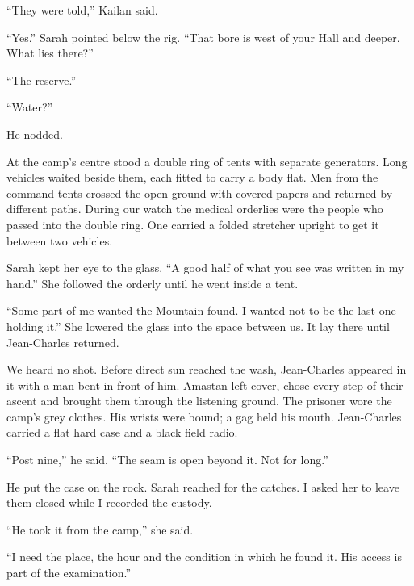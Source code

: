 ``They were told,'' Kailan said.\par

``Yes.'' Sarah pointed below the rig. ``That bore is west of your Hall and deeper. What lies there?''\par

``The reserve.''\par

``Water?''\par

He nodded.\par

At the camp's centre stood a double ring of tents with separate generators. Long vehicles waited beside them, each fitted to carry a body flat. Men from the command tents crossed the open ground with covered papers and returned by different paths. During our watch the medical orderlies were the people who passed into the double ring. One carried a folded stretcher upright to get it between two vehicles.\par

Sarah kept her eye to the glass. ``A good half of what you see was written in my hand.'' She followed the orderly until he went inside a tent.\par

``Some part of me wanted the Mountain found. I wanted not to be the last one holding it.'' She lowered the glass into the space between us. It lay there until Jean-Charles returned.\par

We heard no shot. Before direct sun reached the wash, Jean-Charles appeared in it with a man bent in front of him. Amastan left cover, chose every step of their ascent and brought them through the listening ground. The prisoner wore the camp's grey clothes. His wrists were bound; a gag held his mouth. Jean-Charles carried a flat hard case and a black field radio.\par

``Post nine,'' he said. ``The seam is open beyond it. Not for long.''\par

He put the case on the rock. Sarah reached for the catches. I asked her to leave them closed while I recorded the custody.\par

``He took it from the camp,'' she said.\par

``I need the place, the hour and the condition in which he found it. His access is part of the examination.''\par

